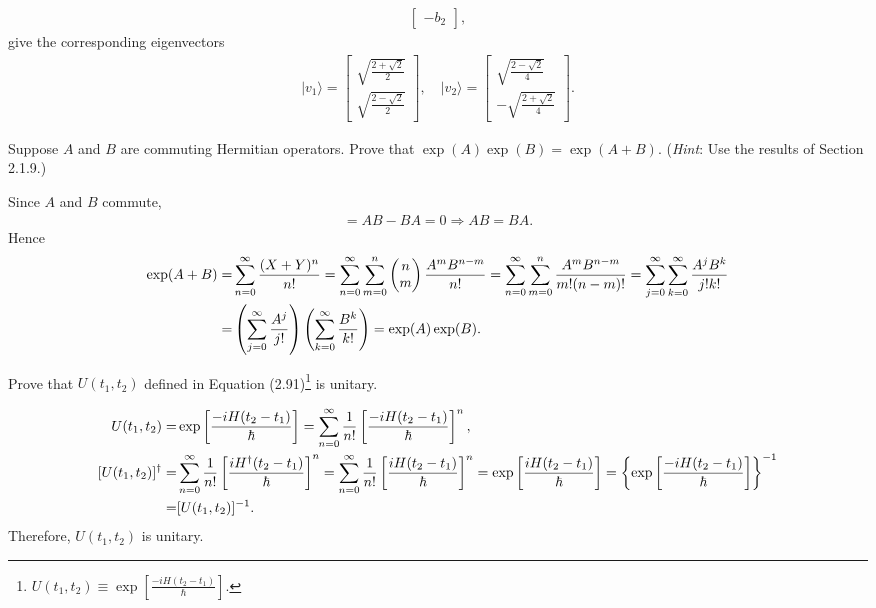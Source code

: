 \documentclass[en]{sol-man}
\begin{document}
\begin{sol}
\begin{align}
\begin{bmatrix}
            -b_2
        \end{bmatrix},
    \end{align}
    give the corresponding eigenvectors
    \begin{align}
        \lvert v_1\rangle=\begin{bmatrix}
            \sqrt{\frac{2+\sqrt{2}}{2}}\\
            \sqrt{\frac{2-\sqrt{2}}{2}}
        \end{bmatrix},\quad\lvert v_2\rangle=\begin{bmatrix}
            \sqrt{\frac{2-\sqrt{2}}{4}}\\
            -\sqrt{\frac{2+\sqrt{2}}{4}}
        \end{bmatrix}.
    \end{align}
\end{sol}

\begin{exe}
    Suppose $A$ and $B$ are commuting Hermitian operators. Prove that $\exp(A)\exp(B)=\exp(A+B)$. (\emph{Hint}: Use the results of Section 2.1.9.)
\end{exe}
\begin{pf}
    Since $A$ and $B$ commute,
    \begin{align}
        [A,B]=AB-BA=0\Longrightarrow AB=BA.
    \end{align}
    Hence
    \begin{align}
        \notag\exp(A+B)=&\sum_{n=0}^{\infty}\frac{(X+Y)^n}{n!}=\sum_{n=0}^{\infty}\sum_{m=0}^n\left(\begin{matrix}
            n\\
            m
        \end{matrix}\right)\frac{A^mB^{n-m}}{n!}=\sum_{n=0}^{\infty}\sum_{m=0}^n\frac{A^mB^{n-m}}{m!(n-m)!}=\sum_{j=0}^{\infty}\sum_{k=0}^{\infty}\frac{A^jB^k}{j!k!}\\
        =&\left(\sum_{j=0}^{\infty}\frac{A^j}{j!}\right)\left(\sum_{k=0}^{\infty}\frac{B^k}{k!}\right)=\exp(A)\exp(B).
    \end{align}
\end{pf}

\begin{exe}
    Prove that $U(t_1,t_2)$ defined in Equation (2.91)\footnote{$U(t_1,t_2)\equiv\exp\left[\frac{-iH(t_2-t_1)}{\hbar}\right]$.} is unitary.
\end{exe}
\begin{pf}
    \begin{align}
        U(t_1,t_2)=&\exp\left[\frac{-iH(t_2-t_1)}{\hbar}\right]=\sum_{n=0}^{\infty}\frac{1}{n!}\left[\frac{-iH(t_2-t_1)}{\hbar}\right]^n,\\
        \notag[U(t_1,t_2)]^{\dagger}=&\sum_{n=0}^{\infty}\frac{1}{n!}\left[\frac{iH^{\dagger}(t_2-t_1)}{\hbar}\right]^n=\sum_{n=0}^{\infty}\frac{1}{n!}\left[\frac{iH(t_2-t_1)}{\hbar}\right]^n=\exp\left[\frac{iH(t_2-t_1)}{\hbar}\right]=\left\{\exp\left[\frac{-iH(t_2-t_1)}{\hbar}\right]\right\}^{-1}\\
        =&[U(t_1,t_2)]^{-1}.
    \end{align}
    Therefore, $U(t_1,t_2)$ is unitary.
\end{pf}
\end{document}
